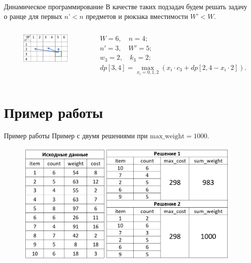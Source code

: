 \documentclass[ignoreonframetext,unicode]{beamer}
\begin{document}
	\begin{frame}{Динамическое программирование}
		В качестве таких подзадач будем решать задачу о ранце для первых $n’<n$ предметов и рюкзака вместимости $W’<W$.
			\begin{columns}
			\begin{figure}[H]
				\includegraphics[scale=0.37]{таблица}
			\end{figure}
			\begin{gather*}
				W=6,\quad n=4; \\
				n'=3,\quad W'=5;\\
				w_3=2,\quad k_3=2;\\
				dp[3,4]=\max_{x_i=0,1,2}(x_i\cdot c_3+dp[2,4-x_i\cdot2]).
				\end{gather*}
		\end{columns}
	\end{frame}
	
	\section{Пример работы}	
	\begin{frame}{Пример работы}
	Пример с двумя решениями при $\textrm{max\_weight}=1000$.	\begin{figure}[H]
			\centering
			\includegraphics[scale=0.25]{пример}
		\end{figure}	
	\end{frame}
\end{document}
